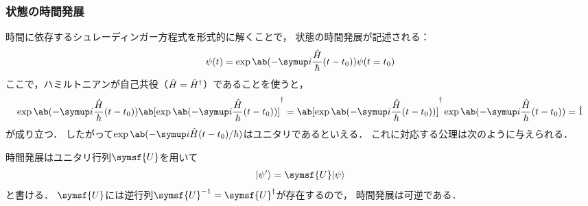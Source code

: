 \documentclass[
]{sotsu}
\begin{document}
\subsubsection{状態の時間発展}

時間に依存するシュレーディンガー方程式を形式的に解くことで，
状態の時間発展が記述される：
\begin{equation*}
    \psi(t) = \exp \ab(-\iu \frac{\hat{H}}{\hbar} (t - t_0)) \psi(t = t_0)
\end{equation*}
ここで，ハミルトニアンが自己共役（$\hat{H} = {\hat{H}}^\dagger$）であることを使うと，
\begin{equation*}
      \exp \ab(-\iu \frac{\hat{H}}{\hbar} (t - t_0))
      \adjoint{\ab[ \exp \ab(-\iu \frac{\hat{H}}{\hbar} (t - t_0)) ]}
    = \adjoint{\ab[ \exp \ab(-\iu \frac{\hat{H}}{\hbar} (t - t_0)) ]}
      \exp \ab(-\iu \frac{\hat{H}}{\hbar} (t - t_0))
    = \idop
\end{equation*}
が成り立つ．
したがって$\exp \ab( -\iu \hat{H} (t - t_0) / \hbar )$はユニタリであるといえる．
これに対応する公理は次のように与えられる．

\begin{qmaxiom}
    時間発展はユニタリ行列$\symsf{U}$を用いて
    \begin{equation}
        \ket{\psi'} = \symsf{U} \ket{\psi}
    \end{equation}
    と書ける．
    $\symsf{U}$には逆行列$\symsf{U}^{-1} = \adjoint{\symsf{U}}$が存在するので，
    時間発展は可逆である．
\end{qmaxiom}
\end{document}
